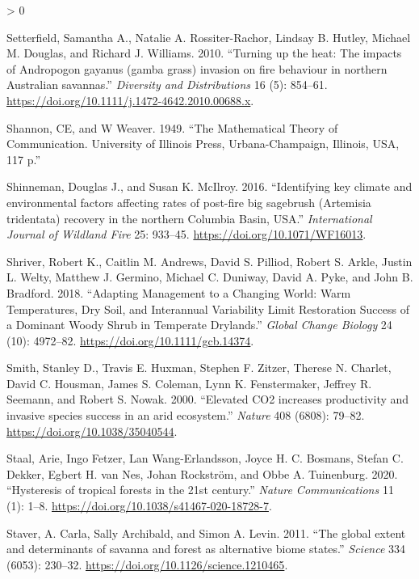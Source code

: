 \documentclass[
  12pt,
]{article}
\newlength{\cslhangindent}
\newenvironment{CSLReferences}[2] %
 {%
  \setlength{\parindent}{0pt}
  \ifodd #1 \everypar{\setlength{\hangindent}{\cslhangindent}}\ignorespaces\fi
  \ifnum #2 > 0
  \setlength{\parskip}{#2\baselineskip}
  \fi
 }%
 {}
\begin{document}
\begin{CSLReferences}{1}{0}
\leavevmode\hypertarget{ref-Setterfield2010}{}%
Setterfield, Samantha A., Natalie A. Rossiter-Rachor, Lindsay B. Hutley,
Michael M. Douglas, and Richard J. Williams. 2010. {``{Turning up the
heat: The impacts of Andropogon gayanus (gamba grass) invasion on fire
behaviour in northern Australian savannas}.''} \emph{Diversity and
Distributions} 16 (5): 854--61.
\url{https://doi.org/10.1111/j.1472-4642.2010.00688.x}.

\leavevmode\hypertarget{ref-Shannon1949}{}%
Shannon, CE, and W Weaver. 1949. {``The Mathematical Theory of
Communication. University of Illinois Press, Urbana-Champaign, Illinois,
USA, 117 p.''}

\leavevmode\hypertarget{ref-Shinneman2016}{}%
Shinneman, Douglas J., and Susan K. McIlroy. 2016. {``{Identifying key
climate and environmental factors affecting rates of post-fire big
sagebrush (Artemisia tridentata) recovery in the northern Columbia
Basin, USA}.''} \emph{International Journal of Wildland Fire} 25:
933--45. \url{https://doi.org/10.1071/WF16013}.

\leavevmode\hypertarget{ref-Shriver2018}{}%
Shriver, Robert K., Caitlin M. Andrews, David S. Pilliod, Robert S.
Arkle, Justin L. Welty, Matthew J. Germino, Michael C. Duniway, David A.
Pyke, and John B. Bradford. 2018. {``Adapting Management to a Changing
World: {Warm} Temperatures, Dry Soil, and Interannual Variability Limit
Restoration Success of a Dominant Woody Shrub in Temperate Drylands.''}
\emph{Global Change Biology} 24 (10): 4972--82.
\url{https://doi.org/10.1111/gcb.14374}.

\leavevmode\hypertarget{ref-Smith2000}{}%
Smith, Stanley D., Travis E. Huxman, Stephen F. Zitzer, Therese N.
Charlet, David C. Housman, James S. Coleman, Lynn K. Fenstermaker,
Jeffrey R. Seemann, and Robert S. Nowak. 2000. {``{Elevated CO2
increases productivity and invasive species success in an arid
ecosystem}.''} \emph{Nature} 408 (6808): 79--82.
\url{https://doi.org/10.1038/35040544}.

\leavevmode\hypertarget{ref-Staal2020}{}%
Staal, Arie, Ingo Fetzer, Lan Wang-Erlandsson, Joyce H. C. Bosmans,
Stefan C. Dekker, Egbert H. van Nes, Johan Rockström, and Obbe A.
Tuinenburg. 2020. {``{Hysteresis of tropical forests in the 21st
century}.''} \emph{Nature Communications} 11 (1): 1--8.
\url{https://doi.org/10.1038/s41467-020-18728-7}.

\leavevmode\hypertarget{ref-Staver2011}{}%
Staver, A. Carla, Sally Archibald, and Simon A. Levin. 2011. {``{The
global extent and determinants of savanna and forest as alternative
biome states}.''} \emph{Science} 334 (6053): 230--32.
\url{https://doi.org/10.1126/science.1210465}.


\end{CSLReferences}
\end{document}
